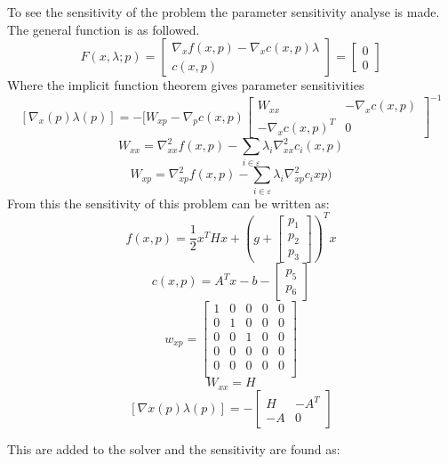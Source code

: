 To see the sensitivity of the problem the parameter sensitivity analyse is made. The general function is as followed. 
\[F(x,\lambda;p)= \begin{bmatrix}
	\nabla_x f(x,p)- \nabla_x c(x,p)\lambda \\ c(x,p)
\end{bmatrix}=\begin{bmatrix}
0 \\ 0
\end{bmatrix}\]
Where the implicit function theorem gives parameter sensitivities
\[[\nabla_x(p) \lambda(p)]=-[W_{xp} -\nabla_p c(x,p)\begin{bmatrix}
W_{xx} & -\nabla_x c(x,p) \\ -\nabla_x c(x,p)^T & 0
\end{bmatrix}^{-1}\]
\[ W_{xx} = \nabla^2_{xx} f(x,p) - \sum\limits_{i\in\varepsilon} \lambda_i\nabla^2_{xx}c_i(x,p)\]
\[ W_{xp} = \nabla^2_{xp} f(x,p) - \sum\limits_{i\in\varepsilon} \lambda_i\nabla^2_{xp}c_i{xp})\]
From this the sensitivity of this problem can be written as:
\[f(x,p) = \dfrac{1}{2}x^T Hx+(g+\begin{bmatrix} p_1 \\ p_2 \\ p_3 \end{bmatrix})^T x\]
\[c(x,p)=A^Tx-b-\begin{bmatrix} p_5 \\ p_6\end{bmatrix}\]
\[w_{xp}=\begin{bmatrix}
1&0&0&0&0\\0&1&0&0&0\\0&0&1&0&0\\0&0&0&0&0\\0&0&0&0&0\\\end{bmatrix}\]
\[W_{xx}=H\]
\[[\nabla x(p) \lambda(p)]= - \begin{bmatrix}H & -A^T \\-A & 0\end{bmatrix}\]

This are added to the solver and the sensitivity are found as:
